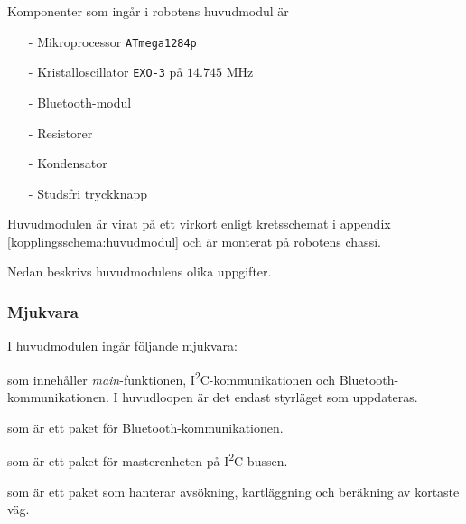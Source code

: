 \documentclass[11pt]{article}
\begin{document}
\begin{flushleft}
Komponenter som ingår i robotens huvudmodul är 
\begin{itemize}
  \item[-] Mikroprocessor \verb+ATmega1284p+
  \item[-] Kristalloscillator \verb+EXO-3+ på $14.745$ MHz
  \item[-] Bluetooth\textsuperscript{\circledR}-modul
  \item[-] Resistorer
  \item[-] Kondensator
  \item[-] Studsfri tryckknapp
\end{itemize}

Huvudmodulen är virat på ett virkort enligt kretsschemat i appendix \ref{kopplingsschema:huvudmodul} och är monterat på robotens chassi. 

Nedan beskrivs huvudmodulens olika uppgifter.

\subsubsection{Mjukvara}
I huvudmodulen ingår följande mjukvara:

\begin{description}[style=unboxed, leftmargin=0cm]
  \item[huvudMain.c] som innehåller \textit{main}-funktionen, I\textsuperscript{2}C-kommunikationen och Bluetooth\textsuperscript{\circledR}-kommunikationen. I huvudloopen är det endast styrläget som uppdateras.
  \item[bluetooth.h] som är ett paket för Bluetooth\textsuperscript{\circledR}-kommunikationen.
  \item[I2C\_master.h] som är ett paket för masterenheten på I\textsuperscript{2}C-bussen.
  \item[searchPath.h] som är ett paket som hanterar avsökning, kartläggning och beräkning av kortaste väg.
\end{description}


\end{flushleft}
\end{document}

